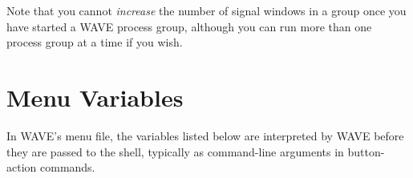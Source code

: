 \documentclass[twoside]{book}
\newcommand{\WAVE}{{\sf WAVE}\xspace}
\begin{document}
Note that you cannot \emph{increase} the number of signal windows in a group
once you have started a \WAVE{} process group, although you can run more
than one process group at a time if you wish.

\chapter{Menu Variables}
\label{ch:menu-variables}

In \WAVE{}'s menu file, the variables listed below are interpreted by
\WAVE{} before they are passed to the shell, typically as command-line
arguments in button-action commands.

\vspace{.5cm}
\end{document}
